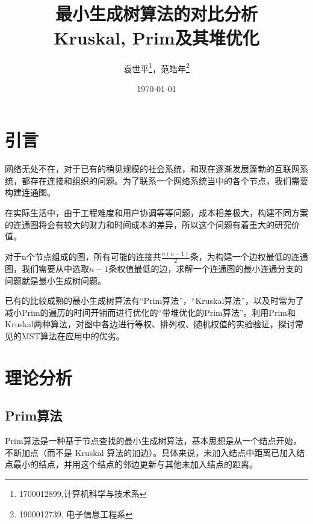 \documentclass[UTF8]{ctexart}
\title{\heiti {科技交流与写作课程论文} \\ \Huge 最小生成树算法的对比分析\\ \huge Kruskal, Prim及其堆优化}
\author{\kaishu 袁世平\footnote{1700012899,计算机科学与技术系}，范皓年\footnote{1900012739, 电子信息工程系}}
\date{\today}
\begin{document}
\maketitle

\tableofcontents
\newpage
\section{引言}
网络无处不在，对于已有的稍见规模的社会系统，和现在逐渐发展蓬勃的互联网系统，都存在连接和组织的问题。为了联系一个网络系统当中的各个节点，我们需要构建连通图。

在实际生活中，由于工程难度和用户协调等等问题，成本相差极大，构建不同方案的连通图将会有较大的财力和时间成本的差异，所以这个问题有着重大的研究价值。

对于n个节点组成的图，所有可能的连接共\(\frac{n(n-1)}{2}\)条，为构建一个边权最低的连通图，我们需要从中选取\(n-1\)条权值最低的边，求解一个连通图的最小连通分支的问题就是最小生成树问题。

已有的比较成熟的最小生成树算法有“Prim算法”，“Kruskal算法”\cite{RN4}，以及时常为了减小Prim的遍历的时间开销而进行优化的“带堆优化的Prim算法”。利用Prim和Kruskal两种算法，对图中各边进行等权、排列权、随机权值的实验验证，探讨常见的MST算法在应用中的优劣。


\section{理论分析}\label{sec:theo}
\subsection{Prim算法} 

Prim算法\cite{RN3}是一种基于节点查找的最小生成树算法，基本思想是从一个结点开始，不断加点（而不是 Kruskal 算法的加边）。具体来说，未加入结点中距离已加入结点最小的结点，并用这个结点的邻边更新与其他未加入结点的距离。
\end{document}
